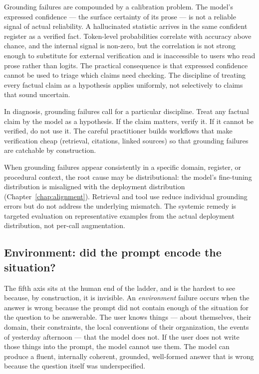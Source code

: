 Grounding failures are compounded by a calibration problem. The
model's expressed confidence --- the surface certainty of its
prose --- is not a reliable signal of actual reliability. A
hallucinated statistic arrives in the same confident register as
a verified fact. Token-level probabilities correlate with accuracy
above chance, and the internal signal is non-zero, but the
correlation is not strong enough to substitute for external
verification and is inaccessible to users who read prose rather
than logits. The practical consequence is that expressed
confidence cannot be used to triage which claims need checking.
The discipline of treating every factual claim as a hypothesis
applies uniformly, not selectively to claims that sound uncertain.

In diagnosis, grounding failures call for a particular discipline.
Treat any factual claim by the model as a hypothesis. If the claim
matters, verify it. If it cannot be verified, do not use it. The
careful practitioner builds workflows that make verification cheap
(retrieval, citations, linked sources) so that grounding failures
are catchable by construction.

When grounding failures appear consistently in a specific domain,
register, or procedural context, the root cause may be
distributional: the model's fine-tuning distribution is
misaligned with the deployment distribution (Chapter~\ref{chap:alignment}). Retrieval
and tool use reduce individual grounding errors but do not address
the underlying mismatch. The systemic remedy is targeted evaluation
on representative examples from the actual deployment distribution,
not per-call augmentation.

\subsection{Environment: did the prompt encode the situation?}

The fifth axis sits at the human end of the ladder, and is the
hardest to see because, by construction, it is invisible. An
\emph{environment} failure occurs when the answer is wrong because
the prompt did not contain enough of the situation for the
question to be answerable. The user knows things --- about
themselves, their domain, their constraints, the local conventions
of their organization, the events of yesterday afternoon --- that
the model does not. If the user does not write those things into
the prompt, the model cannot use them. The model can produce a
fluent, internally coherent, grounded, well-formed answer that is
wrong because the question itself was underspecified.

